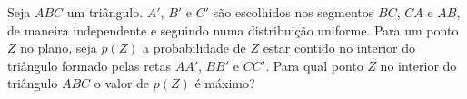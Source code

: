 Seja $ABC$ um triângulo.
$A'$, $B'$ e $C'$ são escolhidos nos segmentos $BC$, $CA$ e $AB$, de maneira independente e seguindo numa distribuição uniforme.
Para um ponto $Z$ no plano, seja $p(Z)$ a probabilidade de $Z$ estar contido no interior do triângulo formado pelas retas $AA'$, $BB'$ e $CC'$.
Para qual ponto $Z$ no interior do triângulo $ABC$ o valor de $p(Z)$ é máximo?

